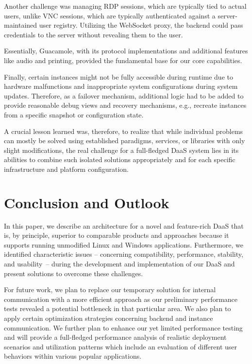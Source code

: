 \documentclass[runningheads]{llncs}
\begin{document}
Another challenge was managing RDP sessions, which are typically tied to actual users,
unlike VNC sessions, which are typically authenticated against
a server-maintained user registry.
Utilizing the WebSocket proxy, the backend could pass credentials
to the server without revealing them to the user.

Essentially, Guacamole, with its protocol implementations and additional features like audio and printing,
provided the fundamental base for our core capabilities.

Finally, certain instances might not be fully accessible during runtime
due to hardware malfunctions and inappropriate system configurations during system updates.
Therefore, as a failover mechanism, additional logic had to be added
to provide reasonable debug views and recovery mechanisms,
e.g., recreate instances from a specific snapshot or configuration state.

A crucial lesson learned was, therefore, to realize that
while individual problems can mostly be solved
using established paradigms, services, or libraries with only slight modifications,
the real challenge for a full-fledged DaaS system lies in its abilities
to combine such isolated solutions appropriately
and for each specific infrastructure and platform configuration.

\section{Conclusion and Outlook}\label{sec:Conclusions}

In this paper, we describe an architecture for a novel
and feature-rich DaaS that is, by principle,
superior to comparable products and approaches
because it supports running unmodified Linux and Windows applications.
Furthermore, we identified characteristic issues
-- concerning compatibility, performance, stability, and usability --
during the development and implementation of our DaaS
and present solutions to overcome these challenges.

For future work,
we plan to replace our temporary solution for internal communication
with a more efficient approach as our preliminary performance tests revealed
a potential bottleneck in that particular area.
We also plan to apply certain optimization strategies
concerning backend and instance communication.
We further plan to enhance our yet limited performance testing
and will provide a full-fledged performance analysis
of realistic deployment scenarios and utilization patterns
which include an evaluation of different user behaviors
within various popular applications.
\end{document}
